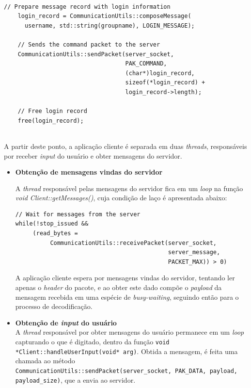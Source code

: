 \documentclass{article}
\begin{document}
\\
\begin{lstlisting}[xleftmargin=-.1\textwidth, xrightmargin=-.1\textwidth]
    // Prepare message record with login information
    login_record = CommunicationUtils::composeMessage(
      username, std::string(groupname), LOGIN_MESSAGE);

    // Sends the command packet to the server
    CommunicationUtils::sendPacket(server_socket,
                                   PAK_COMMAND, 
                                   (char*)login_record,
                                   sizeof(*login_record) +
                                   login_record->length); 

    // Free login record
    free(login_record);


\end{lstlisting}

\par A partir deste ponto, a aplicação cliente é separada em duas \textit{threads}, responsáveis por receber \textit{input} do usuário e obter mensagens do servidor.
\begin{itemize}
\item \textbf{Obtenção de mensagens vindas do servidor}
\\
\par A \textit{thread} responsável pelas mensagens do servidor fica em um \textit{loop} na função \textit{void Client::getMessages()}, cuja condição de laço é apresentada abaixo:
\\
\begin{lstlisting}[xleftmargin=-.1\textwidth, xrightmargin=-.1\textwidth]
    // Wait for messages from the server
while(!stop_issued && 
     (read_bytes = 
          CommunicationUtils::receivePacket(server_socket, 
                                            server_message,
                                            PACKET_MAX)) > 0)
\end{lstlisting}
\par A aplicação cliente espera por mensagens vindas do servidor, tentando ler apenas o \textit{header} do pacote, e ao obter este dado compõe o \textit{payload} da mensagem recebida em uma espécie de \textit{busy-waiting}, seguindo então para o processo de decodificação.

\item \textbf{Obtenção de \textit{input} do usuário}
\\ A \textit{thread} responsável por obter mensagens do usuário permanece em um \textit{loop} capturando o que é digitado, dentro da função \texttt{void *Client::handleUserInput(void* arg)}. Obtida a mensagem, é feita uma chamada ao método \\
\texttt{CommunicationUtils::sendPacket(server\_socket, PAK\_DATA, payload, payload\_size)}, que a envia ao servidor.
\end{itemize}
\end{document}
